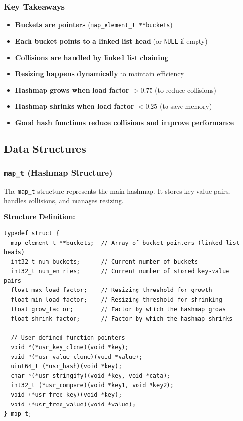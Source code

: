 \documentclass[titlepage]{article}
\begin{document}
\subsubsection{Key Takeaways}
\begin{itemize}
    \item \textbf{Buckets are pointers} (\texttt{map\_element\_t **buckets})
    \item \textbf{Each bucket points to a linked list head} (or \texttt{NULL} if empty)
    \item \textbf{Collisions are handled by linked list chaining}
    \item \textbf{Resizing happens dynamically} to maintain efficiency
    \item \textbf{Hashmap grows when load factor $> 0.75$} (to reduce collisions)
    \item \textbf{Hashmap shrinks when load factor $< 0.25$} (to save memory)
    \item \textbf{Good hash functions reduce collisions and improve performance}
\end{itemize}

\subsection{Data Structures}

\subsubsection{\texttt{map\_t} (Hashmap Structure)}
The \texttt{map\_t} structure represents the main hashmap. It stores key-value pairs, handles collisions, and manages resizing.

\textbf{Structure Definition:}
\begin{verbatim}
typedef struct {
  map_element_t **buckets;  // Array of bucket pointers (linked list heads)
  int32_t num_buckets;      // Current number of buckets
  int32_t num_entries;      // Current number of stored key-value pairs
  float max_load_factor;    // Resizing threshold for growth
  float min_load_factor;    // Resizing threshold for shrinking
  float grow_factor;        // Factor by which the hashmap grows
  float shrink_factor;      // Factor by which the hashmap shrinks

  // User-defined function pointers
  void *(*usr_key_clone)(void *key);
  void *(*usr_value_clone)(void *value);
  uint64_t (*usr_hash)(void *key);
  char *(*usr_stringify)(void *key, void *data);
  int32_t (*usr_compare)(void *key1, void *key2);
  void (*usr_free_key)(void *key);
  void (*usr_free_value)(void *value);
} map_t;
\end{verbatim}
\end{document}
